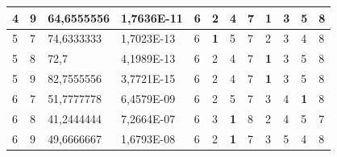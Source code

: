 \documentclass[conference]{IEEEtran}
\begin{document}
\begin{table}[]
\begin{tabular}{|llll|llllllll|}
		\multicolumn{1}{|l|}{4}   & \multicolumn{1}{l|}{9}         & \multicolumn{1}{l|}{64,6555556}    & 1,7636E-11 & \multicolumn{1}{l|}{6}   & \multicolumn{1}{l|}{2}          & \multicolumn{1}{l|}{4}          & \multicolumn{1}{l|}{7}   & \multicolumn{1}{l|}{\textbf{1}} & \multicolumn{1}{l|}{3}          & \multicolumn{1}{l|}{5}          & 8                      \\ \hline
		\multicolumn{1}{|l|}{5}   & \multicolumn{1}{l|}{7}         & \multicolumn{1}{l|}{74,6333333}    & 1,7023E-13 & \multicolumn{1}{l|}{6}   & \multicolumn{1}{l|}{\textbf{1}} & \multicolumn{1}{l|}{5}          & \multicolumn{1}{l|}{7}   & \multicolumn{1}{l|}{2}          & \multicolumn{1}{l|}{3}          & \multicolumn{1}{l|}{4}          & 8                      \\ \hline
		\multicolumn{1}{|l|}{5}   & \multicolumn{1}{l|}{8}         & \multicolumn{1}{l|}{72,7}          & 4,1989E-13 & \multicolumn{1}{l|}{6}   & \multicolumn{1}{l|}{2}          & \multicolumn{1}{l|}{4}          & \multicolumn{1}{l|}{7}   & \multicolumn{1}{l|}{\textbf{1}} & \multicolumn{1}{l|}{3}          & \multicolumn{1}{l|}{5}          & 8                      \\ \hline
		\multicolumn{1}{|l|}{5}   & \multicolumn{1}{l|}{9}         & \multicolumn{1}{l|}{82,7555556}    & 3,7721E-15 & \multicolumn{1}{l|}{6}   & \multicolumn{1}{l|}{2}          & \multicolumn{1}{l|}{4}          & \multicolumn{1}{l|}{7}   & \multicolumn{1}{l|}{\textbf{1}} & \multicolumn{1}{l|}{3}          & \multicolumn{1}{l|}{5}          & 8                      \\ \hline
		\multicolumn{1}{|l|}{6}   & \multicolumn{1}{l|}{7}         & \multicolumn{1}{l|}{51,7777778}    & 6,4579E-09 & \multicolumn{1}{l|}{6}   & \multicolumn{1}{l|}{2}          & \multicolumn{1}{l|}{5}          & \multicolumn{1}{l|}{7}   & \multicolumn{1}{l|}{3}          & \multicolumn{1}{l|}{4}          & \multicolumn{1}{l|}{\textbf{1}} & 8                      \\ \hline
		\multicolumn{1}{|l|}{6}   & \multicolumn{1}{l|}{8}         & \multicolumn{1}{l|}{41,2444444}    & 7,2664E-07 & \multicolumn{1}{l|}{6}   & \multicolumn{1}{l|}{3}          & \multicolumn{1}{l|}{\textbf{1}} & \multicolumn{1}{l|}{8}   & \multicolumn{1}{l|}{2}          & \multicolumn{1}{l|}{4}          & \multicolumn{1}{l|}{5}          & 7                      \\ \hline
		\multicolumn{1}{|l|}{6}   & \multicolumn{1}{l|}{9}         & \multicolumn{1}{l|}{49,6666667}    & 1,6793E-08 & \multicolumn{1}{l|}{6}   & \multicolumn{1}{l|}{2}          & \multicolumn{1}{l|}{\textbf{1}} & \multicolumn{1}{l|}{7}   & \multicolumn{1}{l|}{3}          & \multicolumn{1}{l|}{5}          & \multicolumn{1}{l|}{4}          & 8                      \\ \hline

\end{tabular}
\end{table}
\end{document}
